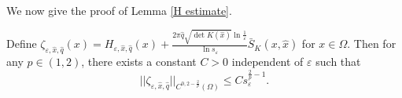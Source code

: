 \documentclass[12pt,reqno]{amsart}
\numberwithin{equation}{section}
\theoremstyle{definition}
\newenvironment{customthm}[1]
{\renewcommand\theinnercustomthm{#1}\innercustomthm}
{\endinnercustomthm}
\theoremstyle{remark}
\begin{document}
We now give the proof of Lemma \ref{H estimate}.

\begin{customthm}{A.3}\label{lemA3}
	Define $ \zeta_{\varepsilon, \hat{x}, \hat{q}}(x)=H_{\varepsilon, \hat{x}, \hat{q}}(x)+\frac{2\pi\hat{q}\sqrt{\det K(\hat{x})}\ln\frac{1}{\varepsilon}}{\ln s_\varepsilon}\bar{S}_K(x,\hat{x}) $ for $ x\in\Omega $. Then for any $ p\in(1,2) $, there exists a constant $ C>0 $ independent of $ \varepsilon $ such that
\begin{equation*}
||\zeta_{\varepsilon, \hat{x}, \hat{q}}||_{C^{0,2-\frac{2}{p}}(\Omega)}\leq Cs_\varepsilon^{\frac{2}{p}-1}.
\end{equation*}
\end{customthm}
\end{document}
